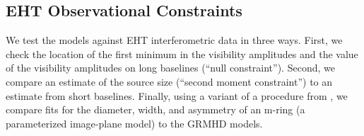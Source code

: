 \subsection{EHT Observational Constraints}




We test the models against EHT interferometric data in three ways.
First, we check the location of the first minimum in the visibility amplitudes and the value of the visibility amplitudes on long baselines (``null constraint'').
Second, we compare an estimate of the source size (``second moment constraint'') to an estimate from short baselines.
Finally, using a variant of a procedure from , we compare fits for the diameter, width, and asymmetry of an m-ring (a parameterized image-plane model) to the GRMHD models.

